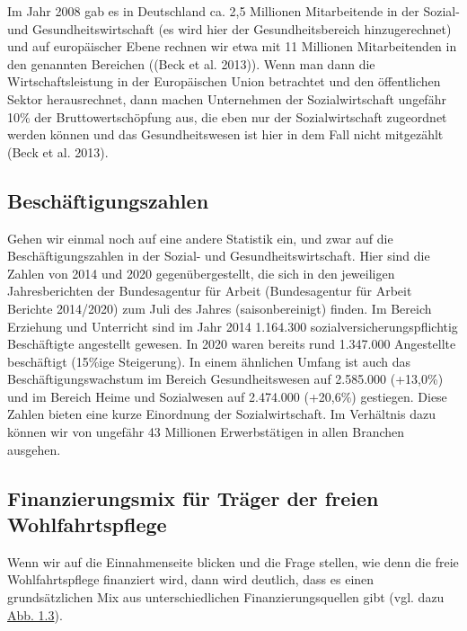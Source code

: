 \documentclass[
  letterpaper,
]{book}
\begin{document}
Im Jahr 2008 gab es in Deutschland ca. 2,5 Millionen Mitarbeitende in
der Sozial- und Gesundheitswirtschaft (es wird hier der
Gesundheitsbereich hinzugerechnet) und auf europäischer Ebene rechnen
wir etwa mit 11 Millionen Mitarbeitenden in den genannten Bereichen
((Beck et al. 2013)). Wenn man dann die Wirtschaftsleistung in der
Europäischen Union betrachtet und den öffentlichen Sektor herausrechnet,
dann machen Unternehmen der Sozialwirtschaft ungefähr 10\% der
Bruttowertschöpfung aus, die eben nur der Sozialwirtschaft zugeordnet
werden können und das Gesundheitswesen ist hier in dem Fall nicht
mitgezählt (Beck et al. 2013).

\subsection{Beschäftigungszahlen}\label{beschaeftigungszahlen}

Gehen wir einmal noch auf eine andere Statistik ein, und zwar auf die
Beschäftigungszahlen in der Sozial- und Gesundheitswirtschaft. Hier sind
die Zahlen von 2014 und 2020 gegenübergestellt, die sich in den
jeweiligen Jahresberichten der Bundesagentur für Arbeit (Bundesagentur
für Arbeit Berichte 2014/2020) zum Juli des Jahres (saisonbereinigt)
finden. Im Bereich Erziehung und Unterricht sind im Jahr 2014 1.164.300
sozialversicherungspflichtig Beschäftigte angestellt gewesen. In 2020
waren bereits rund 1.347.000 Angestellte beschäftigt (15\%ige
Steigerung). In einem ähnlichen Umfang ist auch das
Beschäftigungswachstum im Bereich Gesundheitswesen auf 2.585.000
(+13,0\%) und im Bereich Heime und Sozialwesen auf 2.474.000 (+20,6\%)
gestiegen. Diese Zahlen bieten eine kurze Einordnung der
Sozialwirtschaft. Im Verhältnis dazu können wir von ungefähr 43
Millionen Erwerbstätigen in allen Branchen ausgehen.

\subsection{Finanzierungsmix für Träger der freien
Wohlfahrtspflege}\label{finanzierungsmix}

Wenn wir auf die Einnahmenseite blicken und die Frage stellen, wie denn
die freie Wohlfahrtspflege finanziert wird, dann wird deutlich, dass es
einen grundsätzlichen Mix aus unterschiedlichen Finanzierungsquellen
gibt (vgl. dazu \hyperref[figure13]{Abb. 1.3}).
\end{document}
